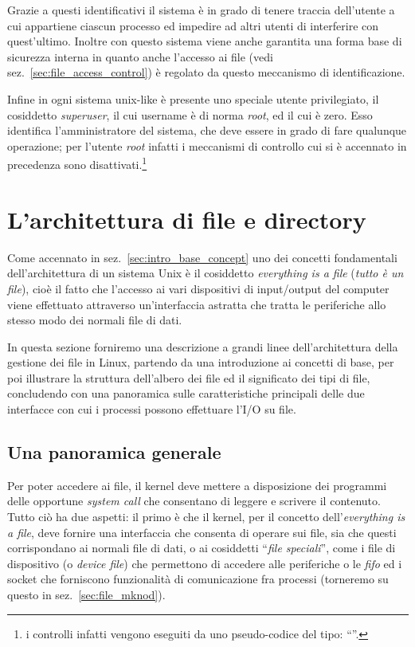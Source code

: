 Grazie a questi identificativi il sistema è in grado di tenere traccia
dell'utente a cui appartiene ciascun processo ed impedire ad altri utenti di
interferire con quest'ultimo.  Inoltre con questo sistema viene anche
garantita una forma base di sicurezza interna in quanto anche l'accesso ai
file (vedi sez.~\ref{sec:file_access_control}) è regolato da questo meccanismo
di identificazione.

Infine in ogni sistema unix-like è presente uno speciale utente privilegiato,
il cosiddetto \textit{superuser}, il cui username è di norma \textit{root}, ed
il cui  è zero. Esso identifica l'amministratore del sistema, che
deve essere in grado di fare qualunque operazione; per l'utente \textit{root}
infatti i meccanismi di controllo cui si è accennato in precedenza sono
disattivati.\footnote{i controlli infatti vengono eseguiti da uno pseudo-codice
  del tipo: ``''.}


\section{L'architettura di file e directory}
\label{sec:intro_file_dir}

Come accennato in sez.~\ref{sec:intro_base_concept} uno dei concetti
fondamentali dell'architettura di un sistema Unix è il cosiddetto
\textit{everything is a file} (\textsl{tutto è un file}), cioè il fatto che
l'accesso ai vari dispositivi di input/output del computer viene effettuato
attraverso un'interfaccia astratta che tratta le periferiche allo stesso modo
dei normali file di dati.

In questa sezione forniremo una descrizione a grandi linee dell'architettura
della gestione dei file in Linux, partendo da una introduzione ai concetti di
base, per poi illustrare la struttura dell'albero dei file ed il significato
dei tipi di file, concludendo con una panoramica sulle caratteristiche
principali delle due interfacce con cui i processi possono effettuare l'I/O su
file.


\subsection{Una panoramica generale}
\label{sec:file_arch_overview}

Per poter accedere ai file, il kernel deve mettere a disposizione dei
programmi delle opportune \textit{system call} che consentano di leggere e
scrivere il contenuto. Tutto ciò ha due aspetti: il primo è che il kernel, per
il concetto dell'\textit{everything is a file}, deve fornire una interfaccia
che consenta di operare sui file, sia che questi corrispondano ai normali file
di dati, o ai cosiddetti ``\textsl{file speciali}'', come i file di
dispositivo (o \textit{device file}) che permettono di accedere alle
periferiche o le \textit{fifo} ed i socket che forniscono funzionalità di
comunicazione fra processi (torneremo su questo in sez.~\ref{sec:file_mknod}).

